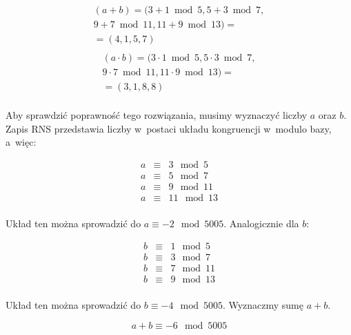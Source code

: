\documentclass[a4paper,10pt, twocolumn]{article}
\begin{document}
\begin{equation*}
 \begin{array}{c}(a + b) = (3 + 1 \bmod{5}, 5 + 3 \bmod{7}, \\ 9 + 7 \bmod{11}, 11 + 9 \bmod{13}) = \\ =  (4, 1, 5, 7) \\ \end{array}
\end{equation*}
\begin{equation*}
 \begin{array}{c}(a \cdot b) = (3 \cdot 1 \bmod{5}, 5 \cdot 3 \bmod{7}, \\ 9 \cdot 7 \bmod{11}, 11 \cdot 9 \bmod{13}) = \\ =  (3, 1, 8, 8) \\ \end{array}
\end{equation*}

\noindent Aby sprawdzić poprawność tego rozwiązania, musimy wyznaczyć liczby $a$ oraz $b$. Zapis RNS przedstawia liczby w~postaci układu kongruencji w~modulo bazy, a~więc:

\begin{equation*}
 \begin{array}{lcl}a & \equiv & 3 \mod 5 \\ a & \equiv & 5 \mod 7 \\ a & \equiv & 9 \mod 11 \\ a & \equiv & 11 \mod 13 \\ \end{array}
\end{equation*}

\noindent Układ ten można sprowadzić do $a \equiv -2 \mod 5005$. Analogicznie dla $b$:

\begin{equation*}
 \begin{array}{lcl}b & \equiv & 1 \mod 5 \\ b & \equiv & 3 \mod 7 \\ b & \equiv & 7 \mod 11 \\ b & \equiv & 9 \mod 13 \\ \end{array}
\end{equation*}

\noindent Układ ten można sprowadzić do $b \equiv -4 \mod 5005$. Wyznaczmy sumę $a + b$.

\begin{equation*}
 a + b \equiv -6 \mod 5005
\end{equation*}
\end{document}
